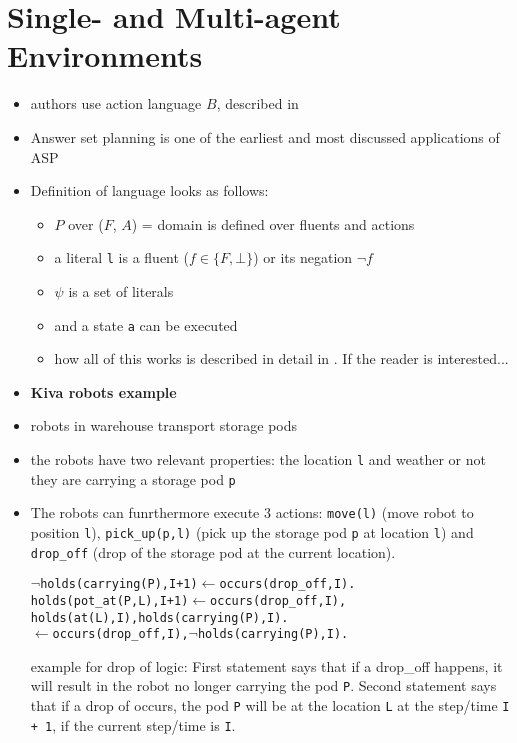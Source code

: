 \documentclass[runningheads]{llncs}
\begin{document}
\section{Single- and Multi-agent Environments}


\begin{itemize}
    \item authors use action language $B$, described in \cite{gelfond1998action}
    \item Answer set planning is one of the earliest and most discussed applications of ASP \cite{marek1999stable, niemela1999logic}
    \item Definition of language looks as follows: 
    \begin{itemize}
        \item $P$ over ($F$, $A$) = domain is defined over fluents and actions
        \item a literal \verb|l| is a fluent ($f \in \{F,\bot\}$) or its negation $\neg f$
        \item $\psi$ is a set of literals
        \item and a state \verb|a| can be executed
        \item how all of this works is described in detail in \cite{gelfond1998action}. If the reader is interested...
    \end{itemize}
    \item \textbf{Kiva robots example}
    \item robots in warehouse transport storage pods
    \item the robots have two relevant properties: the location \verb|l| and weather or not they are carrying a storage pod \verb|p|
    \item The robots can funrthermore execute 3 actions: \verb|move(l)| (move robot to position \verb|l|), \verb|pick_up(p,l)| (pick up the storage pod \verb|p| at location \verb|l|) and \verb|drop_off| (drop of the storage pod at the current location).
    \begin{alltt}
        \(\neg\)holds(carrying(P), I + 1) \(\leftarrow\) occurs(drop_off, I).
        holds(pot_at(P, L), I + 1) \(\leftarrow\) occurs(drop_off, I), 
            holds(at(L), I), holds(carrying(P), I). 
        \(\leftarrow\) occurs(drop_off, I), \(\neg\)holds(carrying(P), I). 
    \end{alltt}
    example for drop of logic: First statement says that if a drop\_off happens, it will result in the robot no longer carrying the pod \verb|P|. 
    Second statement says that if a drop of occurs, the pod \verb|P| will be at the location \verb|L| at the step/time \verb|I + 1|, if the current step/time is \verb|I|. 

\end{itemize}
\end{document}
